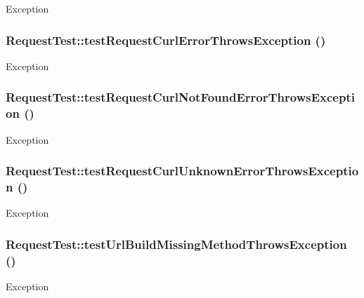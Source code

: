 \label{classRequestTest_a9ea34bc4bf4394c214013d651e819ef2}
Exception \hypertarget{classRequestTest_af908eba074694d3a67e8a7eeb41acd89}{
\subsubsection[{testRequestCurlErrorThrowsException}]{\setlength{\rightskip}{0pt plus 5cm}RequestTest::testRequestCurlErrorThrowsException ()}}
\label{classRequestTest_af908eba074694d3a67e8a7eeb41acd89}
Exception \hypertarget{classRequestTest_a89d8d17dd32d36a81927903c2315614a}{
\subsubsection[{testRequestCurlNotFoundErrorThrowsException}]{\setlength{\rightskip}{0pt plus 5cm}RequestTest::testRequestCurlNotFoundErrorThrowsException ()}}
\label{classRequestTest_a89d8d17dd32d36a81927903c2315614a}
Exception \hypertarget{classRequestTest_a46510f5d63d45a981fe05c34e569a7cb}{
\subsubsection[{testRequestCurlUnknownErrorThrowsException}]{\setlength{\rightskip}{0pt plus 5cm}RequestTest::testRequestCurlUnknownErrorThrowsException ()}}
\label{classRequestTest_a46510f5d63d45a981fe05c34e569a7cb}
Exception \hypertarget{classRequestTest_a02546fc31efd91f7073605417343ae48}{
\subsubsection[{testUrlBuildMissingMethodThrowsException}]{\setlength{\rightskip}{0pt plus 5cm}RequestTest::testUrlBuildMissingMethodThrowsException ()}}
\label{classRequestTest_a02546fc31efd91f7073605417343ae48}
Exception 

